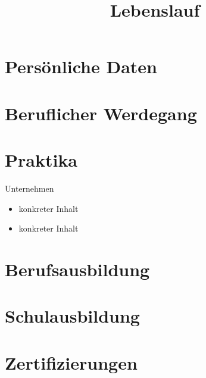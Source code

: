 \title{Lebenslauf}
\makecvtitle

\section{Persönliche Daten}

\section{Beruflicher Werdegang}

\section{Praktika}
{
\begin{minipage}{0.7\textwidth}
    \begin{multicols}{2}
        Unternehmen
        \columnbreak
        \begin{itemize}
            \item{konkreter Inhalt}
            \item{konkreter Inhalt}
        \end{itemize}
    \end{multicols}
\end{minipage}
}{}

\section{Berufsausbildung}

\section{Schulausbildung}

\section{Zertifizierungen}

